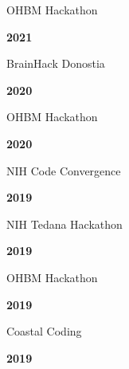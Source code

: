 \documentclass[10pt]{article}
\begin{document}
\begin{minipage}[t]{.85\linewidth}
	\flushleft
	\noindent
	OHBM Hackathon
	\end{minipage}
	\hfill
	\begin{minipage}[t]{.15\linewidth}
	\flushright
	\noindent
	\textsc{\textbf{2021}}
\end{minipage}

\begin{minipage}[t]{.85\linewidth}
	\flushleft
	\noindent
	BrainHack Donostia
	\end{minipage}
	\hfill
	\begin{minipage}[t]{.15\linewidth}
	\flushright
	\noindent
	\textsc{\textbf{2020}}
\end{minipage}

\begin{minipage}[t]{.85\linewidth}
	\flushleft
	\noindent
	OHBM Hackathon
	\end{minipage}
	\hfill
	\begin{minipage}[t]{.15\linewidth}
	\flushright
	\noindent
	\textsc{\textbf{2020}}
\end{minipage}

\begin{minipage}[t]{.85\linewidth}
	\flushleft
	\noindent
	NIH Code Convergence
	\end{minipage}
	\hfill
	\begin{minipage}[t]{.15\linewidth}
	\flushright
	\noindent
	\textsc{\textbf{2019}}
\end{minipage}

\begin{minipage}[t]{.85\linewidth}
	\flushleft
	\noindent
	NIH Tedana Hackathon
	\end{minipage}
	\hfill
	\begin{minipage}[t]{.15\linewidth}
	\flushright
	\noindent
	\textsc{\textbf{2019}}
\end{minipage}

\begin{minipage}[t]{.85\linewidth}
	\flushleft
	\noindent
	OHBM Hackathon
	\end{minipage}
	\hfill
	\begin{minipage}[t]{.15\linewidth}
	\flushright
	\noindent
	\textsc{\textbf{2019}}
\end{minipage}

\begin{minipage}[t]{.85\linewidth}
	\flushleft
	\noindent
	Coastal Coding
	\end{minipage}
	\hfill
	\begin{minipage}[t]{.15\linewidth}
	\flushright
	\noindent
	\textsc{\textbf{2019}}
\end{minipage}
\end{document}
